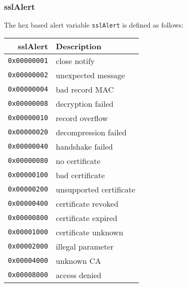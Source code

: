 \documentclass[documentation]{subfiles}
\begin{document}
\subsubsection{sslAlert}\label{sslAlert}
The hex based alert variable {\tt sslAlert} is defined as follows:\\
\begin{minipage}{0.48\textwidth}
    \begin{longtable}{rl}
        \toprule
        {\bf sslAlert} & {\bf Description} \\
        \midrule\endhead%
        {\tt 0x00000001} & close notify\\
        {\tt 0x00000002} & unexpected message\\
        {\tt 0x00000004} & bad record MAC\\
        {\tt 0x00000008} & decryption failed\\
        {\tt 0x00000010} & record overflow\\
        {\tt 0x00000020} & decompression failed\\
        {\tt 0x00000040} & handshake failed\\
        {\tt 0x00000080} & no certificate\\
        {\tt 0x00000100} & bad certificate\\
        {\tt 0x00000200} & unsupported certificate\\
        {\tt 0x00000400} & certificate revoked\\
        {\tt 0x00000800} & certificate expired\\
        {\tt 0x00001000} & certificate unknown\\
        {\tt 0x00002000} & illegal parameter\\
        {\tt 0x00004000} & unknown CA\\
        {\tt 0x00008000} & access denied\\
        \bottomrule
    \end{longtable}
\end{minipage}%
\hfill
\end{document}
